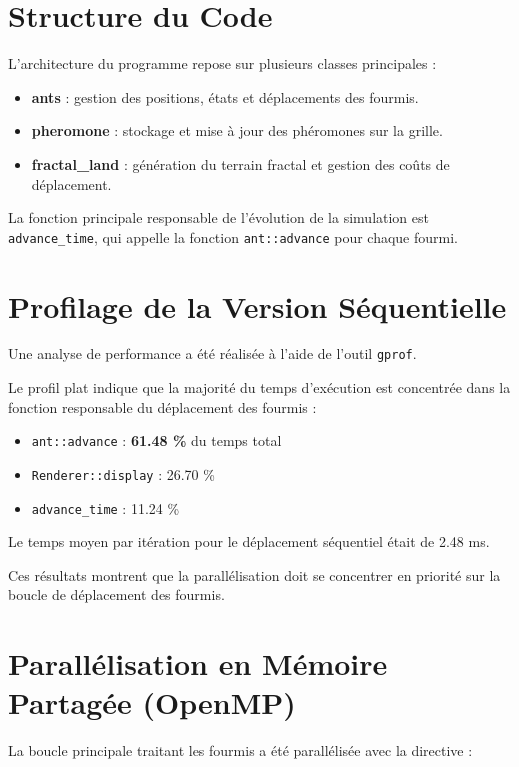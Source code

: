 \documentclass[12pt, a4paper]{article}
\begin{document}
\section{Structure du Code}

L’architecture du programme repose sur plusieurs classes principales :

\begin{itemize}
\item \textbf{ants} : gestion des positions, états et déplacements des fourmis.
\item \textbf{pheromone} : stockage et mise à jour des phéromones sur la grille.
\item \textbf{fractal\_land} : génération du terrain fractal et gestion des coûts de déplacement.
\end{itemize}

La fonction principale responsable de l’évolution de la simulation est \texttt{advance\_time}, qui appelle la fonction \texttt{ant::advance} pour chaque fourmi.

\section{Profilage de la Version Séquentielle}

Une analyse de performance a été réalisée à l’aide de l’outil \texttt{gprof}.

Le profil plat indique que la majorité du temps d’exécution est concentrée dans la fonction responsable du déplacement des fourmis :

\begin{itemize}
\item \texttt{ant::advance} : \textbf{61.48 \%} du temps total
\item \texttt{Renderer::display} : 26.70 \%
\item \texttt{advance\_time} : 11.24 \%
\end{itemize}

Le temps moyen par itération pour le déplacement séquentiel était de 2.48 ms.

Ces résultats montrent que la parallélisation doit se concentrer en priorité sur la boucle de déplacement des fourmis.

\section{Parallélisation en Mémoire Partagée (OpenMP)}

La boucle principale traitant les fourmis a été parallélisée avec la directive :
\end{document}
